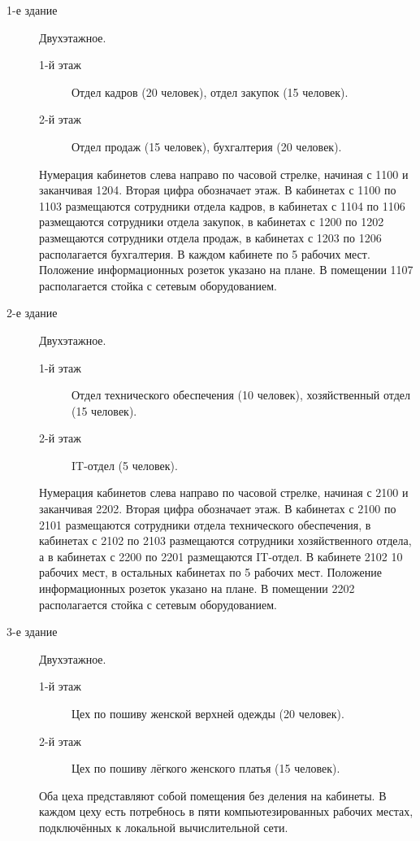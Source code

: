 \begin{description}
\item [1-е здание]
  Двухэтажное.
  \begin{description} 
  \item[1-й этаж]
  Отдел кадров (20 человек), отдел закупок (15 человек).
\item[2-й этаж]
  Отдел продаж (15 человек), бухгалтерия (20 человек).
\end{description}
Нумерация кабинетов слева направо по часовой стрелке, начиная с 1100 и заканчивая 1204. Вторая цифра обозначает этаж. В кабинетах с 1100 по 1103 размещаются сотрудники отдела кадров, в кабинетах с 1104 по 1106 размещаются сотрудники отдела закупок, в кабинетах с 1200 по 1202 размещаются сотрудники отдела продаж, в кабинетах с 1203 по 1206 располагается бухгалтерия. В каждом кабинете по 5 рабочих мест. Положение информационных розеток указано на плане. В помещении 1107 располагается стойка с сетевым оборудованием.
\item [2-е здание]
  Двухэтажное.
  \begin{description}
\item [1-й этаж]
  Отдел технического обеспечения (10 человек), хозяйственный отдел (15 человек).
\item[2-й этаж]
  IT-отдел (5 человек).
\end{description}
  Нумерация кабинетов слева направо по часовой стрелке, начиная с 2100 и заканчивая 2202. Вторая цифра обозначает этаж. В кабинетах с 2100 по 2101 размещаются сотрудники отдела технического обеспечения, в кабинетах с 2102 по 2103 размещаются сотрудники хозяйственного отдела, а в кабинетах с 2200 по 2201 размещаются IT-отдел.
  В кабинете 2102 10 рабочих мест, в остальных кабинетах по 5 рабочих мест. Положение информационных розеток указано на плане. В помещении 2202 располагается стойка с сетевым оборудованием.
\item [3-е здание]
  Двухэтажное.
 \begin{description} 
 \item[1-й этаж]
  Цех по пошиву женской верхней одежды (20 человек).
  \item[2-й этаж]
  Цех по пошиву лёгкого женского платья (15 человек).
\end{description}
  Оба цеха представляют собой помещения без деления на кабинеты. В каждом цеху есть потребнось в пяти компьютезированных рабочих местах, подключённых к  локальной вычислительной сети.
  

\end{description}
